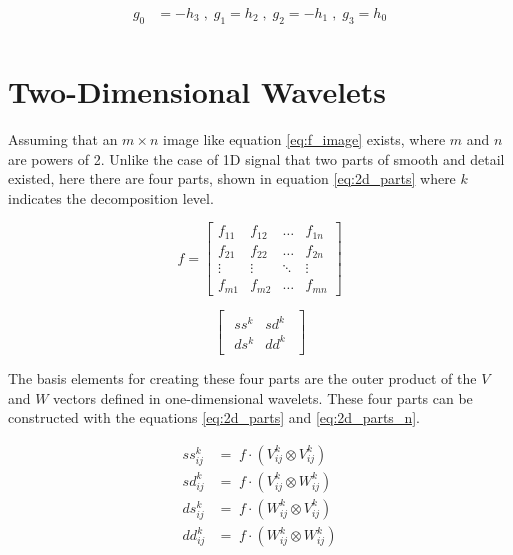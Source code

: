 \documentclass[12pt]{article}
\begin{document}
	\begin{equation}
		\begin{aligned}
			g_0 &= -h_3 \;,\; g_1 = h_2 \;,\; g_2 = -h_1 \;,\; g_3 = h_0 \\
		\end{aligned}
		\label{eq:g_sym2}
	\end{equation}
	
	\section{Two-Dimensional Wavelets}
	
	Assuming that an $m\times n$ image like equation \ref{eq:f_image} exists, where $m$ and $n$ are powers of 2. Unlike the case of 1D signal that two parts of smooth and detail existed, here there are four parts, shown in equation \ref{eq:2d_parts} where $k$ indicates the decomposition level.
	
	\begin{equation}
		f = 
		\begin{bmatrix}
			f_{11} & f_{12} & \dots & f_{1n} \\
			f_{21} & f_{22} & \dots & f_{2n} \\
			\vdots & \vdots & \ddots & \vdots \\
			f_{m1} & f_{m2} & \dots & f_{mn} 
		\end{bmatrix}
		\label{eq:f_image}
	\end{equation}
		
	\begin{equation}
		\begin{bmatrix}
		\begin{array}{c|c}
			ss^k & sd^k \\
			\hline
			ds^k & dd^k
		\end{array}
		\end{bmatrix}
	\end{equation}
	
	The basis elements for creating these four parts are the outer product of the $V$ and $W$ vectors defined in one-dimensional wavelets. These four parts can be constructed with the equations \ref{eq:2d_parts} and \ref{eq:2d_parts_n}.
	
	\begin{equation}
		\begin{aligned}
		ss_{ij}^k &= \; f \cdot (V_{ij}^k \otimes V_{ij}^k) \\
		sd_{ij}^k &= \; f \cdot (V_{ij}^k \otimes W_{ij}^k) \\
		ds_{ij}^k &= \; f \cdot (W_{ij}^k \otimes V_{ij}^k) \\
		dd_{ij}^k &= \; f \cdot (W_{ij}^k \otimes W_{ij}^k)
		\end{aligned}
		\label{eq:2d_parts}
	\end{equation}
\end{document}
